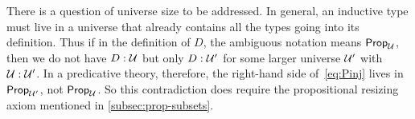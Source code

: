 \documentclass[hott-all.tex]{subfiles}
\begin{document}
% 
\begin{rmk}
  There is a question of universe size to be addressed.
  In general, an inductive type must live in a universe that already contains all the types going into its definition.
  Thus if in the definition of $D$, the ambiguous notation \prop means $\mathsf{Prop}_{\mathcal{U}}$, then we do not have $D:\mathcal{U}$ but only $D:\mathcal{U}'$ for some larger universe $\mathcal{U}'$ with $\mathcal{U}:\mathcal{U}'$.
  In a predicative theory, therefore, the right-hand side of~\eqref{eq:Pinj} lives in $\mathsf{Prop}_{\mathcal{U}'}$, not $\mathsf{Prop}_\mathcal{U}$.
  So this contradiction does require the propositional resizing axiom
  mentioned in \cref{subsec:prop-subsets}.
\end{rmk}
% 
% 
\end{document}
